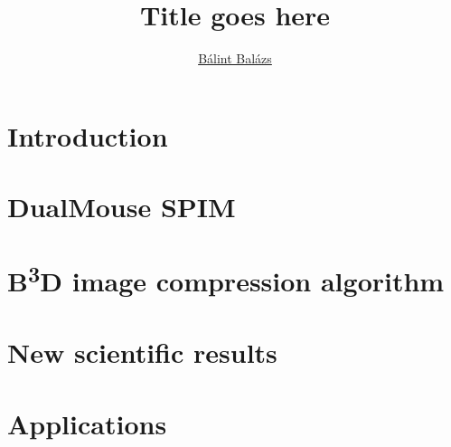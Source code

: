 \documentclass{theses_style}
\author{\href{mailto:balint.balazs@embl.de}{Bálint Balázs}}
\title{Title goes here}
\def\b3d{B\textsuperscript{3}D}
\begin{document}
\maketitle

\newpage
\setcounter{page}{1}
\section{Introduction}
\cite{huisken_even_2007}
\lipsum

\section{DualMouse SPIM}

\section{\b3d image compression algorithm}

\section{New scientific results}

\section{Applications}


{ \small }
\end{document}
